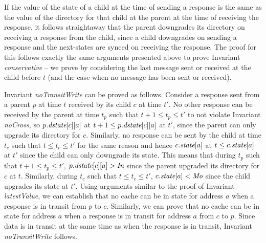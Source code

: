If the value of the state of a child at the time of sending a response is the
same as the value of the directory for that child at the parent at the time of
receiving the response, it follows straightaway that the parent downgrades its
directory on receiving a response from the child, since a child downgrades on
sending a response and the next-states are synced on receiving the response.
The proof for this follows exactly the same arguments presented above to prove
Invariant \textit{conservative} -- we prove by considering the last message
sent or received at the child before $t$ (and the case when no message has been
sent or received).

Invariant \textit{noTransitWrite} can be proved as follows. Consider a response
sent from a parent $p$ at time $t$ received by its child $c$ at time $t'$. No
other response can be received by the parent at time $t_p$ such that $t+1 \le
t_p \le t'$ to not violate Invariant \textit{noCross}, so $p.\textit{dstate}[c][a]$ at
$t+1 \le p.\textit{dstate}[c][a]$ at $t'$, since the parent can only upgrade its
directory for $c$. Similarly, no response can be sent by the child at time
$t_c$ such that $t \le t_c \le t'$ for the same reason and hence $c.\textit{state}[a]$
at $t \le c.\textit{state}[a]$ at $t'$ since the child can only downgrade its state.
This means that during $t_p$ such that $t+1 \le t_p \le t'$, $p.\textit{dstate}[c][a]
> \textit{In}$ since the parent upgraded its directory for $c$ at $t$. Similarly,
during $t_c$ such that $t \le t_c \le t'$, $c.\textit{state}[a] < \textit{Mo}$ since the
child upgrades its state at $t'$. Using arguments similar to the proof of
Invariant \textit{latestValue}, we can establish that no cache can be in \Mo{}
state for address $a$ when a response is in transit from $p$ to $c$.
Similarly, we can prove that no cache can be in \Mo{} state for address $a$
when a response is in transit for address $a$ from $c$ to $p$. Since data is in
transit at the same time as when the response is in transit, Invariant
\textit{noTransitWrite} follows.

